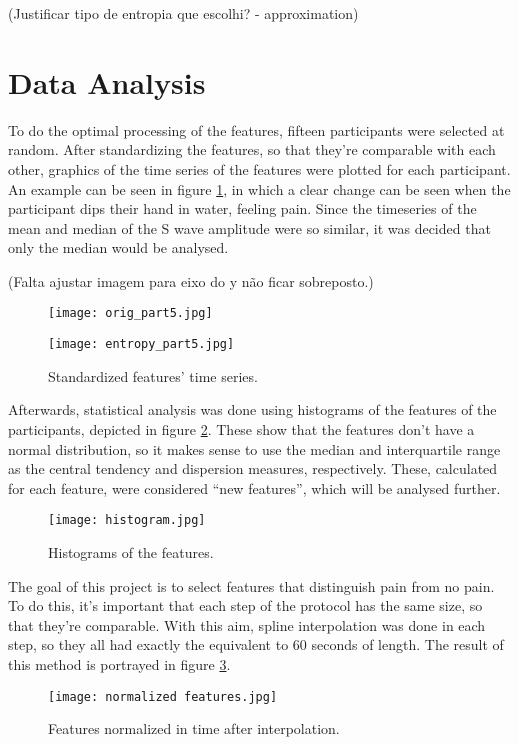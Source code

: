 (Justificar tipo de entropia que escolhi? - approximation)




\section{Data Analysis}
To do the optimal processing of the features, fifteen participants were selected at random. After standardizing the features, so that they're comparable with each other, graphics of the time series of the features were plotted for each participant. An example can be seen in figure \ref{fig:featurestimeseries}, in which a clear change can be seen when the participant dips their hand in water, feeling pain. Since the timeseries of the mean and median of the S wave amplitude were so similar, it was decided that only the median would be analysed.

(Falta ajustar imagem para eixo do y não ficar sobreposto.)

\begin{figure}[htbp]
    \centering
    \begin{minipage}{0.48\textwidth}
        \centering
        \texttt{[image: orig\_part5.jpg]}
    \end{minipage}
    \hspace{0.005\textwidth} %
    \begin{minipage}{0.48\textwidth}
        \centering
        \texttt{[image: entropy\_part5.jpg]}
    \end{minipage}
    \caption{Standardized features' time series.}
    \label{fig:featurestimeseries}
\end{figure}

Afterwards, statistical analysis was done using histograms of the features of the participants, depicted in figure \ref{fig:histogram}. These show that the features don’t have a normal distribution, so it makes sense to use the median and interquartile range as the central tendency and dispersion measures, respectively. These, calculated for each feature, were considered “new features”, which will be analysed further.

\begin{figure}[h!]
    \centering
    \texttt{[image: histogram.jpg]}
    \caption{Histograms of the features.}
    \label{fig:histogram}
\end{figure}

The goal of this project is to select features that distinguish pain from no pain. To do this, it’s important that each step of the protocol has the same size, so that they’re comparable. With this aim, spline interpolation was done in each step, so they all had exactly the equivalent to 60 seconds of length. The result of this method is portrayed in figure \ref{fig:normalizedfeatures}. 

\begin{figure}[h!]
    \centering
    \texttt{[image: normalized features.jpg]}
    \caption{Features normalized in time after interpolation.}
    \label{fig:normalizedfeatures}
\end{figure}









